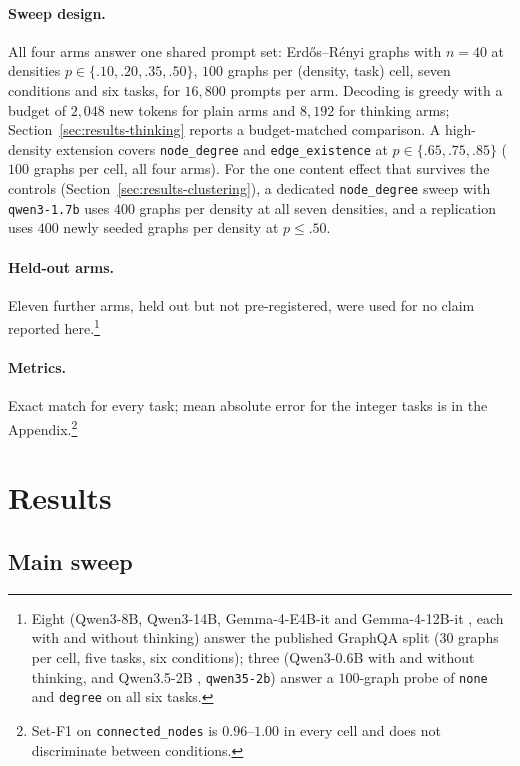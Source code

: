 \documentclass[11pt]{article}
\begin{document}
\paragraph{Sweep design.} All four arms answer one shared prompt set:
Erd\H{o}s--R\'enyi graphs \citep{erdosrenyi1959random} with $n{=}40$ at
densities $p\in\{.10,.20,.35,.50\}$, $100$ graphs per (density, task) cell,
seven conditions and six tasks, for $16{,}800$ prompts per arm. Decoding is
greedy with a budget of $2{,}048$ new tokens for plain arms and $8{,}192$
for thinking arms; Section~\ref{sec:results-thinking} reports a
budget-matched comparison. A high-density extension covers
\texttt{node\_degree} and \texttt{edge\_existence} at $p\in\{.65,.75,.85\}$
($100$ graphs per cell, all four arms). For the one content effect that
survives the controls (Section~\ref{sec:results-clustering}), a dedicated
\texttt{node\_degree} sweep with \texttt{qwen3-1.7b} uses $400$ graphs per
density at all seven densities, and a replication uses $400$ newly seeded
graphs per density at $p\le.50$.

\paragraph{Held-out arms.} Eleven further arms, held out but not
pre-registered, were used for no claim reported here.\footnote{Eight
(Qwen3-8B, Qwen3-14B, Gemma-4-E4B-it and Gemma-4-12B-it \citep{gemma4},
each with and without thinking) answer the published GraphQA split ($30$
graphs per cell, five tasks, six conditions); three (Qwen3-0.6B with and
without thinking, and Qwen3.5-2B \citep{qwen35}, \texttt{qwen35-2b})
answer a $100$-graph probe of \texttt{none} and \texttt{degree} on all six
tasks.}

\paragraph{Metrics.} Exact match for every task; mean absolute error for
the integer tasks is in the Appendix.\footnote{Set-F1 on
\texttt{connected\_nodes} is $0.96$--$1.00$ in every cell and does not
discriminate between conditions.}

\section{Results}
\label{sec:results}

\subsection{Main sweep}
\label{sec:results-main}
\end{document}
